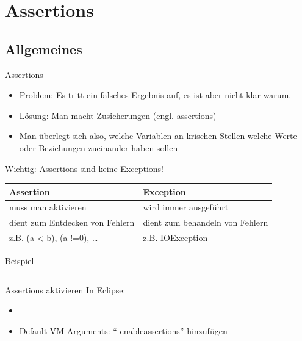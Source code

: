 \documentclass[usepdftitle=false,hyperref={pdfpagelabels=false}]{beamer}
\begin{document}
\section{Assertions}
\subsection{Allgemeines}
\begin{frame}{Assertions}
    \begin{itemize}[<+->]
        \item Problem: Es tritt ein falsches Ergebnis auf, es ist
              aber nicht klar warum.
        \item Lösung: Man macht Zusicherungen (engl. assertions)
        \item Man überlegt sich also, welche Variablen an
              krischen Stellen welche Werte oder Beziehungen
              zueinander haben sollen
    \end{itemize}
    \pause[\thebeamerpauses]
    \begin{alertblock}{Wichtig: Assertions sind keine Exceptions!}
        \begin{tabular}{l|l}
            \textbf{Assertion}                  & \textbf{Exception}\\
            \hline
            muss man aktivieren                 & wird immer ausgeführt\\
            dient zum Entdecken von Fehlern     & dient zum behandeln von Fehlern\\
            z.B. (a < b), (a !=0), \dots        & z.B. \href{http://docs.oracle.com/javase/7/docs/api/java/io/IOException.html}{IOException}\\
        \end{tabular}
    \end{alertblock}
\end{frame}

\begin{frame}{Beispiel}
    \inputminted[linenos=false, tabsize=4, fontsize=\small]{java}{singleLines.java}
\end{frame}

\begin{frame}{Assertions aktivieren}
    In Eclipse:
    \begin{itemize}
        \item {}
        \item Default VM Arguments: "`-enableassertions"' hinzufügen
    \end{itemize}
\end{frame}
\end{document}
